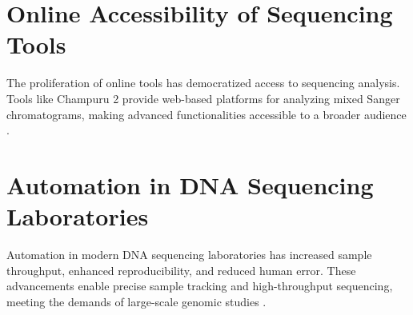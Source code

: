 \section{Online Accessibility of Sequencing Tools}
The proliferation of online tools has democratized access to sequencing analysis. Tools like Champuru 2 provide web-based platforms for analyzing mixed Sanger chromatograms, making advanced functionalities accessible to a broader audience \cite{champuru2}.

\section{Automation in DNA Sequencing Laboratories}
Automation in modern DNA sequencing laboratories has increased sample throughput, enhanced reproducibility, and reduced human error. These advancements enable precise sample tracking and high-throughput sequencing, meeting the demands of large-scale genomic studies \cite{base4}.
